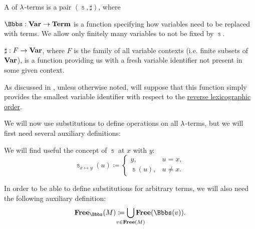 \begin{definition}\label{def:lambda_substitution}\mimprovised
  A  of \( \mathrm{\lambda} \)-terms is a pair \( (\Bbbs, \sharp) \), where
  \begin{thmenum}[series=def:lambda_substitution]
     \( \Bbbs: \op*{Var} \to \op*{Term} \) is a function specifying how variables need to be replaced with terms. We allow only finitely many variables to not be fixed by \( \Bbbs \).

     \( \sharp: F \to \op*{Var} \), where \( F \) is the family of all variable contexts (i.e. finite subsets of \( \op*{Var} \)), is a function providing us with a fresh variable identifier not present in some given context.

    As discussed in , unless otherwise noted, will suppose that this function simply provides the smallest variable identifier with respect to the \hyperref[def:lexicographic_order]{reverse lexicographic order}.
  \end{thmenum}

  We will now use substitutions to define operations on all \( \mathrm{\lambda} \)-terms, but we will first need several auxiliary definitions:
  \begin{thmenum}[resume=def:lambda_substitution]
     We will find useful the concept of  \( \Bbbs \) at \( x \) with \( y \):
    \begin{equation}\label{eq:def:lambda_substitution/modified}
      \Bbbs_{x \mapsto y}(u) \coloneqq \begin{cases}
        y,        &u = x, \\
        \Bbbs(u), &u \neq x.
      \end{cases}
    \end{equation}

     In order to be able to define substitutions for arbitrary terms, we will also need the following auxiliary definition:
    \begin{equation}\label{eq:def:lambda_substitution/free}
      \op*{Free}_\Bbbs(M) \coloneqq \bigcup_{\mathclap{v \in \op*{Free}(M)}} \op*{Free}(\Bbbs(v)).
    \end{equation}


\end{thmenum}
\end{definition}
